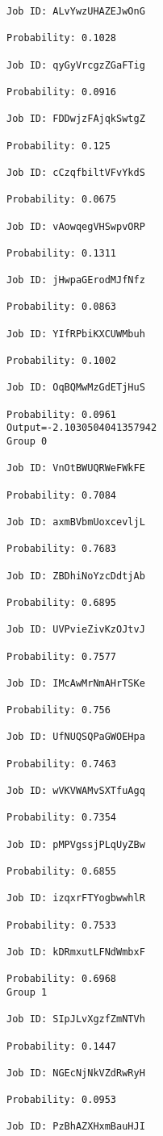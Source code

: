 \documentclass[11pt]{article}
\begin{document}
\begin{Verbatim}[commandchars=\\\{\}]
Job ID: ALvYwzUHAZEJwOnG

Probability: 0.1028

Job ID: qyGyVrcgzZGaFTig

Probability: 0.0916

Job ID: FDDwjzFAjqkSwtgZ

Probability: 0.125

Job ID: cCzqfbiltVFvYkdS

Probability: 0.0675

Job ID: vAowqegVHSwpvORP

Probability: 0.1311

Job ID: jHwpaGErodMJfNfz

Probability: 0.0863

Job ID: YIfRPbiKXCUWMbuh

Probability: 0.1002

Job ID: OqBQMwMzGdETjHuS

Probability: 0.0961
Output=-2.1030504041357942
Group 0

Job ID: VnOtBWUQRWeFWkFE

Probability: 0.7084

Job ID: axmBVbmUoxcevljL

Probability: 0.7683

Job ID: ZBDhiNoYzcDdtjAb

Probability: 0.6895

Job ID: UVPvieZivKzOJtvJ

Probability: 0.7577

Job ID: IMcAwMrNmAHrTSKe

Probability: 0.756

Job ID: UfNUQSQPaGWOEHpa

Probability: 0.7463

Job ID: wVKVWAMvSXTfuAgq

Probability: 0.7354

Job ID: pMPVgssjPLqUyZBw

Probability: 0.6855

Job ID: izqxrFTYogbwwhlR

Probability: 0.7533

Job ID: kDRmxutLFNdWmbxF

Probability: 0.6968
Group 1

Job ID: SIpJLvXgzfZmNTVh

Probability: 0.1447

Job ID: NGEcNjNkVZdRwRyH

Probability: 0.0953

Job ID: PzBhAZXHxmBauHJI


\end{Verbatim}
\end{document}
